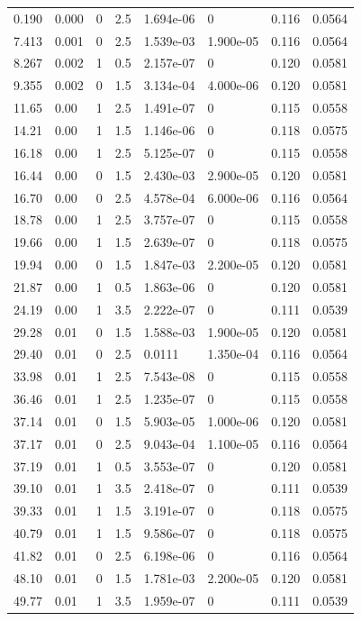 \documentclass[preview]{standalone}
\begin{document}
{{\begin{tabular}{L{1.2cm}C{1.2cm} C{0.3cm}C{0.5cm} C{1.4cm}C{1.4cm} C{1.4cm}C{1.4cm}}
  0.190  &  0.000  & 0     & 2.5 &  1.694e-06  & 0  & 0.116 &  0.0564   \\ 
  7.413  &  0.001  & 0     & 2.5 &  1.539e-03  & 1.900e-05  & 0.116 &  0.0564   \\ 
  8.267  &  0.002  & 1     & 0.5 &  2.157e-07  & 0  & 0.120 &  0.0581   \\ 
  9.355  &  0.002  & 0     & 1.5 &  3.134e-04  & 4.000e-06  & 0.120 &  0.0581   \\ 
  11.65  &  0.00  & 1     & 2.5 &  1.491e-07  & 0  & 0.115 &  0.0558   \\ 
  14.21  &  0.00  & 1     & 1.5 &  1.146e-06  & 0  & 0.118 &  0.0575   \\ 
  16.18  &  0.00  & 1     & 2.5 &  5.125e-07  & 0  & 0.115 &  0.0558   \\ 
  16.44  &  0.00  & 0     & 1.5 &  2.430e-03  & 2.900e-05  & 0.120 &  0.0581   \\ 
  16.70  &  0.00  & 0     & 2.5 &  4.578e-04  & 6.000e-06  & 0.116 &  0.0564   \\ 
  18.78  &  0.00  & 1     & 2.5 &  3.757e-07  & 0  & 0.115 &  0.0558   \\ 
  19.66  &  0.00  & 1     & 1.5 &  2.639e-07  & 0  & 0.118 &  0.0575   \\ 
  19.94  &  0.00  & 0     & 1.5 &  1.847e-03  & 2.200e-05  & 0.120 &  0.0581   \\ 
  21.87  &  0.00  & 1     & 0.5 &  1.863e-06  & 0  & 0.120 &  0.0581   \\ 
  24.19  &  0.00  & 1     & 3.5 &  2.222e-07  & 0  & 0.111 &  0.0539   \\ 
  29.28  &  0.01  & 0     & 1.5 &  1.588e-03  & 1.900e-05  & 0.120 &  0.0581   \\ 
  29.40  &  0.01  & 0     & 2.5 &  0.0111  & 1.350e-04  & 0.116 &  0.0564   \\ 
  33.98  &  0.01  & 1     & 2.5 &  7.543e-08  & 0  & 0.115 &  0.0558   \\ 
  36.46  &  0.01  & 1     & 2.5 &  1.235e-07  & 0  & 0.115 &  0.0558   \\ 
  37.14  &  0.01  & 0     & 1.5 &  5.903e-05  & 1.000e-06  & 0.120 &  0.0581   \\ 
  37.17  &  0.01  & 0     & 2.5 &  9.043e-04  & 1.100e-05  & 0.116 &  0.0564   \\ 
  37.19  &  0.01  & 1     & 0.5 &  3.553e-07  & 0  & 0.120 &  0.0581   \\ 
  39.10  &  0.01  & 1     & 3.5 &  2.418e-07  & 0  & 0.111 &  0.0539   \\ 
  39.33  &  0.01  & 1     & 1.5 &  3.191e-07  & 0  & 0.118 &  0.0575   \\ 
  40.79  &  0.01  & 1     & 1.5 &  9.586e-07  & 0  & 0.118 &  0.0575   \\ 
  41.82  &  0.01  & 0     & 2.5 &  6.198e-06  & 0  & 0.116 &  0.0564   \\ 
  48.10  &  0.01  & 0     & 1.5 &  1.781e-03  & 2.200e-05  & 0.120 &  0.0581   \\ 
  49.77  &  0.01  & 1     & 3.5 &  1.959e-07  & 0  & 0.111 &  0.0539   \\ 
\hline 
\end{tabular} 

}}
\end{document}
